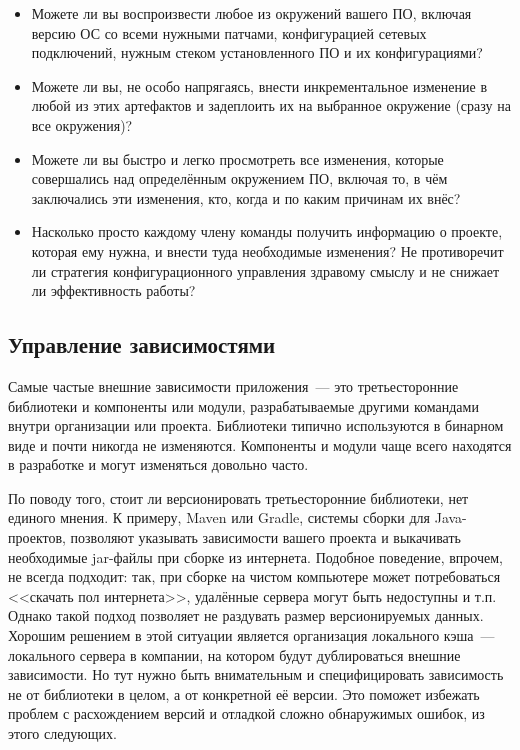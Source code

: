 \documentclass{../../text-style}
\begin{document}
\begin{itemize}
    \item Можете ли вы воспроизвести любое из окружений вашего ПО, включая версию ОС со всеми нужными патчами, конфигурацией сетевых подключений, нужным стеком установленного ПО и их конфигурациями?
    \item Можете ли вы, не особо напрягаясь, внести инкрементальное изменение в любой из этих артефактов и задеплоить их на выбранное окружение (сразу на все окружения)?
    \item Можете ли вы быстро и легко просмотреть все изменения, которые совершались над определённым окружением ПО, включая то, в чём заключались эти изменения, кто, когда и по каким причинам их внёс?
    \item Насколько просто каждому члену команды получить информацию о проекте, которая ему нужна, и внести туда необходимые изменения? Не противоречит ли стратегия конфигурационного управления здравому смыслу и не снижает ли эффективность работы?
\end{itemize}

\subsection{Управление зависимостями}

Самые частые внешние зависимости приложения~--- это третьесторонние библиотеки и компоненты или модули, разрабатываемые другими командами внутри организации или проекта. Библиотеки типично используются в бинарном виде и почти никогда не изменяются. Компоненты и модули чаще всего находятся в разработке и могут изменяться довольно часто.

По поводу того, стоит ли версионировать третьесторонние библиотеки, нет единого мнения. К примеру, Maven или Gradle, системы сборки для Java-проектов, позволяют указывать зависимости вашего проекта и выкачивать необходимые jar-файлы при сборке из интернета. Подобное поведение, впрочем, не всегда подходит: так, при сборке на чистом компьютере может потребоваться <<скачать пол интернета>>, удалённые сервера могут быть недоступны и т.п. Однако такой подход позволяет не раздувать размер версионируемых данных. Хорошим решением в этой ситуации является организация локального кэша~--- локального сервера в компании, на котором будут дублироваться внешние зависимости. Но тут нужно быть внимательным и специфицировать зависимость не от библиотеки в целом, а от конкретной её версии. Это поможет избежать проблем с расхождением версий и отладкой сложно обнаружимых ошибок, из этого следующих.
\end{document}
